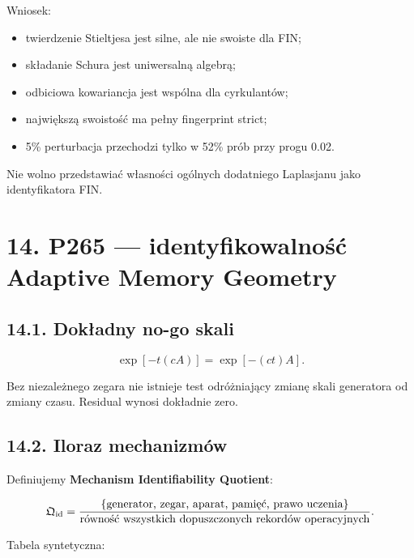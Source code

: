 \documentclass[11pt,a4paper,openany]{report}
\begin{document}
Wniosek:

\begin{itemize}
\item 
twierdzenie Stieltjesa jest silne, ale nie swoiste dla FIN;

\item 
składanie Schura jest uniwersalną algebrą;

\item 
odbiciowa kowariancja jest wspólna dla cyrkulantów;

\item 
największą swoistość ma pełny fingerprint strict;

\item 
5\% perturbacja przechodzi tylko w 52\% prób przy progu 0.02.

\end{itemize}

Nie wolno przedstawiać własności ogólnych dodatniego Laplasjanu jako identyfikatora FIN.

\chapter{14. P265 --- identyfikowalność Adaptive Memory Geometry}

\section{14.1. Dokładny no-go skali}

\[
\exp[-t(cA)]
=
\exp[-(ct)A].
\]

Bez niezale\.znego zegara nie istnieje test odró\.zniający zmianę skali generatora od zmiany czasu. Residual wynosi dokładnie zero.

\section{14.2. Iloraz mechanizmów}

Definiujemy \textbf{Mechanism Identifiability Quotient}:

\[
\mathfrak Q_{\rm id}
=
\frac{
\{\text{generator, zegar, aparat, pamięć, prawo uczenia}\}
}{
\text{równość wszystkich dopuszczonych rekordów operacyjnych}
}.
\]

Tabela syntetyczna:
\end{document}
